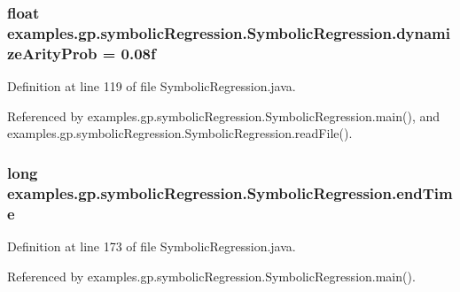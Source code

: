 \hypertarget{classexamples_1_1gp_1_1symbolic_regression_1_1_symbolic_regression_a4a47b26758c7a15c13051f3baa3afdc5}{
\subsubsection[{dynamize\-Arity\-Prob}]{\setlength{\rightskip}{0pt plus 5cm}float examples.\-gp.\-symbolic\-Regression.\-Symbolic\-Regression.\-dynamize\-Arity\-Prob = 0.\-08f\hspace{0.3cm}{\ttfamily [static]}}}\label{classexamples_1_1gp_1_1symbolic_regression_1_1_symbolic_regression_a4a47b26758c7a15c13051f3baa3afdc5}


Definition at line 119 of file Symbolic\-Regression.\-java.



Referenced by examples.\-gp.\-symbolic\-Regression.\-Symbolic\-Regression.\-main(), and examples.\-gp.\-symbolic\-Regression.\-Symbolic\-Regression.\-read\-File().

\hypertarget{classexamples_1_1gp_1_1symbolic_regression_1_1_symbolic_regression_a55a0a74996362e5641e0c0a2a237aa44}{
\subsubsection[{end\-Time}]{\setlength{\rightskip}{0pt plus 5cm}long examples.\-gp.\-symbolic\-Regression.\-Symbolic\-Regression.\-end\-Time\hspace{0.3cm}{\ttfamily [static]}}}\label{classexamples_1_1gp_1_1symbolic_regression_1_1_symbolic_regression_a55a0a74996362e5641e0c0a2a237aa44}


Definition at line 173 of file Symbolic\-Regression.\-java.



Referenced by examples.\-gp.\-symbolic\-Regression.\-Symbolic\-Regression.\-main().

